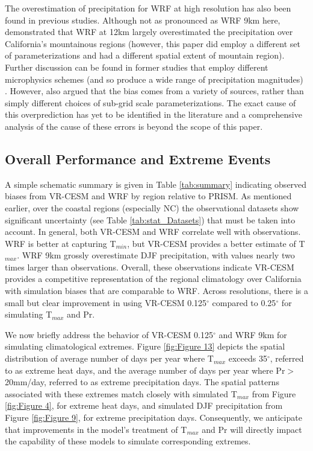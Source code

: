 \documentclass[ms]{agutex}   %
\begin{document}
\begin{article}
The overestimation of precipitation for WRF at high resolution has also been found in previous studies. Although not as pronounced as WRF 9km here, \citet{caldwell2009evaluation} demonstrated that WRF at 12km largely overestimated the precipitation over California's mountainous regions (however, this paper did employ a different set of parameterizations and had a different spatial extent of mountain region). Further discussion can be found in former studies that employ different microphysics schemes (and so produce a wide range of precipitation magnitudes) \citep{jankov2005impact, chin2010preliminary, caldwell2010california}. However, \citet{caldwell2009evaluation} also argued that the bias comes from a variety of sources, rather than simply different choices of sub-grid scale parameterizations. The exact cause of this overprediction has yet to be identified in the literature and a comprehensive analysis of the cause of these errors is beyond the scope of this paper. 

\subsection{Overall Performance and Extreme Events}

A simple schematic summary is given in Table \ref{tab:summary} indicating observed biases from VR-CESM and WRF by region relative to PRISM. As mentioned earlier, over the coastal regions (especially NC) the observational datasets show significant uncertainty (see Table \ref{tab:stat_Datasets}) that must be taken into account. In general, both VR-CESM and WRF correlate well with observations. WRF is better at capturing T$_{min}$, but VR-CESM provides a better estimate of T$_{max}$.  WRF 9km grossly overestimate DJF precipitation, with values nearly two times larger than observations.  Overall, these observations indicate VR-CESM provides a competitive representation of the regional climatology over California with simulation biases that are comparable to WRF. Across resolutions, there is a small but clear improvement in using VR-CESM 0.125$^\circ$ compared to 0.25$^\circ$ for simulating T$_{max}$ and Pr.

We now briefly address the behavior of VR-CESM 0.125$^\circ$ and WRF 9km for simulating climatological extremes.  Figure \ref{fig:Figure 13} depicts the spatial distribution of average number of days per year where T$_{max}$ exceeds 35$^\circ$, referred to as extreme heat days, and the average number of days per year where Pr$>$20mm/day, referred to as extreme precipitation days.  The spatial patterns associated with these extremes match closely with simulated T$_{max}$ from Figure \ref{fig:Figure 4}, for extreme heat days, and simulated DJF precipitation from Figure \ref{fig:Figure 9}, for extreme precipitation days.  Consequently, we anticipate that improvements in the model's treatment of T$_{max}$ and Pr will directly impact the capability of these models to simulate corresponding extremes.


\end{article}
\end{document}
